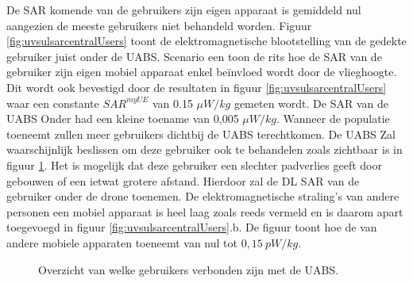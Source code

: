 \documentclass[twocolumn]{phdsymp} %
\begin{document}
De \gls{SAR} komende van de gebruikers zijn eigen apparaat is gemiddeld nul aangezien de meeste gebruikers niet behandeld worden.
Figuur \ref{fig:uvsulsarcentralUsers} toont de elektromagnetische blootstelling van de gedekte gebruiker juist onder de \gls{UABS}.
Scenario een toon de rits hoe de \gls{SAR} van de gebruiker zijn eigen mobiel apparaat enkel be\"invloed wordt door de vlieghoogte.
Dit wordt ook bevestigd door de resultaten in figuur  \ref{fig:uvsulsarcentralUsers} waar een constante 
$SAR^{myUE}$ van 0.15 $\mu W/kg$ gemeten wordt.
De \gls{SAR} van de  \gls{UABS} Onder had een kleine toename van 0,005  $\mu W/kg$.
Wanneer de populatie toeneemt zullen meer gebruikers dichtbij de \gls{UABS} terechtkomen.
De \gls{UABS} Zal waarschijnlijk beslissen om deze gebruiker ook te behandelen zoals zichtbaar is in figuur \ref{fig:connectionMap}.
Het is mogelijk dat deze gebruiker een slechter padverlies geeft door gebouwen of een ietwat grotere afstand. Hierdoor zal de
\gls{DL} \gls{SAR} van de gebruiker onder de drone toenemen.
De elektromagnetische straling's van andere personen een mobiel apparaat is heel laag zoals 
reeds vermeld en is daarom apart toegevoegd in figuur  \ref{fig:uvsulsarcentralUsers}.b.
De figuur toont hoe de  van andere mobiele apparaten toeneemt van nul tot $0,15\ pW/kg$.


\begin{figure}[h]
\hfill
{}
\caption{ Overzicht van welke gebruikers verbonden zijn met de \acs{UABS}.}
  \label{fig:connectionMap}
\end{figure}
\end{document}
